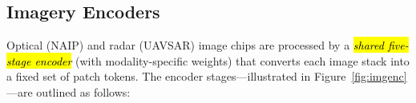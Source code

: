 \documentclass[remotesensing,article,accept,pdftex,moreauthors]{Definitions/mdpi}
\begin{document}
\subsection{Imagery Encoders}
\label{sec:img_enc}



Optical (NAIP) and radar (UAVSAR) image chips are processed by a \emph{\hl{shared five-stage encoder}} (with modality-specific weights) that converts each image stack into a fixed set of patch tokens. The encoder stages—illustrated in Figure~\ref{fig:imgenc}—are outlined as follows:
\end{document}
